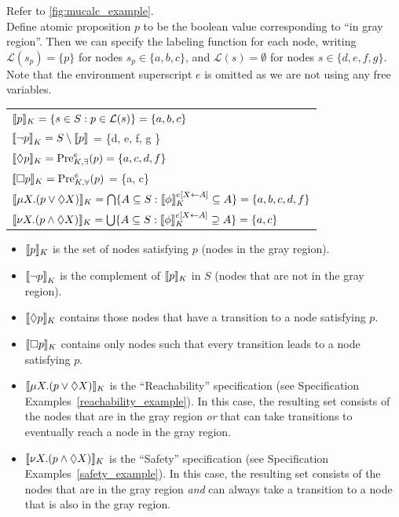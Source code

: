\begin{exmp}\label{mucalc_example}
Refer to \autoref{fig:mucalc_example}.\\
Define atomic proposition $p$ to be the boolean value corresponding to ``in gray region''. Then we can specify the labeling function for each node, writing $\mathcal{L}(s_p) = \{p\}$ for nodes $s_p \in \{a, b, c\}$, and $\mathcal{L}(s) = \emptyset$ for nodes $s \in \{d, e, f, g \}$. Note that the environment superscript $e$ is omitted as we are not using any free variables.

\begin{tabular}{l}\label{table:modal_mucalc_syntax}
    ${\llbracket}{} p {\rrbracket}{}_K = \{s \in S : p \in \mathcal{L}(s) \} = \{a, b, c\}$ \\    
    ${\llbracket} \lnot p {\rrbracket}_K = S \setminus {\llbracket} p {\rrbracket}$ = \{d, e, f, g \} \\
    ${\llbracket}{} \Diamond p {\rrbracket}{}_K = \text{Pre}_{K,\exists}^{e} (p) = \{a, c, d, f\}$ \\
    ${\llbracket}{} \square p {\rrbracket}{}_K = \text{Pre}_{K,\forall}^e (p)$ = \{a, c\} \\
    ${\llbracket}{} \mu X.(p \lor \Diamond X) {\rrbracket}{}_K = \bigcap \{ A \subseteq S : {\llbracket}{} \phi {\rrbracket}{}_K^{e[X \leftarrow A]} \subseteq A \} = \{ a,b,c,d,f \}$ \\
    ${\llbracket}{} \nu X.(p \land \Diamond X) {\rrbracket}{}_K = \bigcup \{ A \subseteq S : {\llbracket}{} \phi {\rrbracket}{}_K^{e[X \leftarrow A]} \supseteq A \} = \{ a, c \}$
\end{tabular}
\begin{itemize}
    \item ${\llbracket}{} p {\rrbracket}{}_K$ is the set of nodes satisfying $p$ (nodes in the gray region).
    \item ${\llbracket} \lnot p {\rrbracket}_K$ is the complement of ${\llbracket}{} p {\rrbracket}{}_K$ in $S$ (nodes that are not in the gray region).
    \item ${\llbracket}{} \Diamond p {\rrbracket}{}_K$ contains those nodes that have a transition to a node satisfying $p$.
    \item ${\llbracket}{} \square p {\rrbracket}{}_K$ contains only nodes such that every transition leads to a node satisfying $p$.
    \item ${\llbracket}{} \mu X.(p \lor \Diamond X) {\rrbracket}{}_K$ is the ``Reachability'' specification (see Specification Examples~\ref{reachability_example}). In this case, the resulting set consists of the nodes that are in the gray region \emph{or} that can take transitions to eventually reach a node in the gray region.
    \item ${\llbracket}{} \nu X.(p \land \Diamond X) {\rrbracket}{}_K$ is the ``Safety'' specification (see Specification Examples~\ref{safety_example}). In this case, the resulting set consists of the nodes that are in the gray region \emph{and} can always take a transition to a node that is also in the gray region. 
\end{itemize}

\end{exmp}


